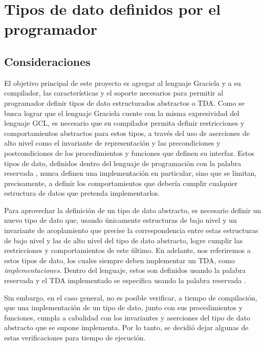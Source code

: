 {{\section{Tipos de dato definidos por el programador}


\subsection{Consideraciones}

El objetivo principal de este proyecto es agregar al lenguaje Graciela y a su
compilador, las características y el soporte necesarios para permitir al
programador definir tipos de dato estructurados abstractos o TDA. Como se busca
lograr que el lenguaje Graciela cuente con la misma expresividad del lenguaje
GCL, es necesario que su compilador permita definir restricciones y
comportamientos abstractos para estos tipos, a través del uso de aserciones de
alto nivel como el invariante de representación y las precondiciones y
postcondiciones de los procedimientos y funciones que definen su interfaz.
Estos tipos de dato, definidos dentro del lenguaje de programación con la
palabra reservada , nunca definen una implementación en
particular, sino que se limitan, precisamente, a definir los comportamientos que
debería cumplir cualquier estructura de datos que pretenda implementarlos.

Para aprovechar la definición de un tipo de dato abstracto, es necesario definir
un nuevo tipo de dato que, usando únicamente estructuras de bajo nivel y un
invariante de acoplamiento que precise la correspondencia entre estas
estructuras de bajo nivel y las de alto nivel del tipo de dato abstracto, logre
cumplir las restricciones y comportamientos de este último. En adelante, nos
referiremos a estos tipos de dato, los cuales siempre deben implementar un TDA,
como \textit{implementaciones}. Dentro del lenguaje, estos son definidos usando
la palabra reservada  y el TDA implementado se especifica usando la
palabra reservada .

Sin embargo, en el caso general, no es posible verificar, a tiempo de
compilación, que una implementación de un tipo de dato, junto con sus
procedimientos y funciones, cumpla a cabalidad con los invariantes y aserciones
del tipo de dato abstracto que se supone implementa. Por lo tanto, se decidió
dejar algunas de estas verificaciones para tiempo de ejecución.

}}
